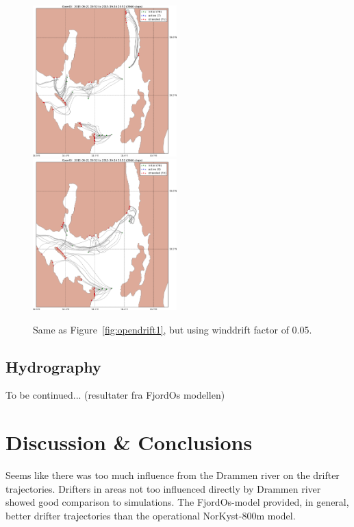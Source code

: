 \documentclass[12pt,a4paper,english]{article}
\begin{document}
\begin{figure}[ht]
\centerline{
\includegraphics*[width=0.495\textwidth]{Opendrift_simulations/LTR3/tokt_drifters_winddrift_0p5_radius_0_num_6_plusminus_2p5h_crop}
\includegraphics*[width=0.495\textwidth]{Opendrift_simulations/LTR3/tokt_drifters_winddrift_0p5_radius_0_num_6_plusminus_2p5h_norkyst_crop}
}
\caption{\small
Same as Figure~\ref{fig:opendrift1}, but using winddrift factor of 0.05.
}
\label{fig:opendrift4}
\end{figure}


\subsection{Hydrography}

To be continued... (resultater fra FjordOs modellen)

\clearpage

\section{Discussion \& Conclusions}

Seems like there was too much influence from the Drammen river on the drifter trajectories. Drifters in areas not too influenced directly by Drammen river showed good comparison to simulations.
The FjordOs-model provided, in general, better drifter trajectories than the operational NorKyst-800m model.
\end{document}
